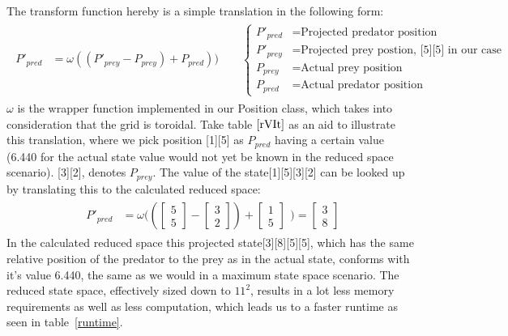 \documentclass[paper=a4, fontsize=11pt]{scrartcl}
\numberwithin{equation}{section}		%
\numberwithin{figure}{section}			%
\numberwithin{table}{section}				%
\begin{document}
\indent The transform function hereby is a simple translation in the following form:
\begin{align}
\begin{split}
P'_{pred} &= \omega((P'_{prey}-P_{prey})+P_{pred}))
\qquad
\begin{cases}
P'_{pred} &= \text{Projected predator position} \\
P'_{prey} &= \text{Projected prey postion, [5][5] in our case} \\
P_{prey} &= \text{Actual prey position} \\
P_{pred} &= \text{Actual predator position}
\end{cases}
\end{split}
\end{align}
$\omega$ is the wrapper function implemented in our Position class, which takes into consideration that the grid is toroidal. 
Take table $\ref{rVIt}$ as an aid to illustrate this translation, where we pick position [1][5] as $P_{pred}$ having a certain value (6.440 for the actual state value would not yet be known in the reduced space scenario). [3][2], denotes $P_{prey}$. The value of the state[1][5][3][2] can be looked up by translating this to the calculated reduced space:
\begin{align}
\begin{split}
P'_{pred}
&=\omega((\begin{bmatrix} 
5 \\
5
\end{bmatrix} -
\begin{bmatrix}
3 \\
2
\end{bmatrix} )+
\begin{bmatrix}
1 \\
5
\end{bmatrix}
\end{split})
=
\begin{bmatrix}
3 \\
8
\end{bmatrix}
\end{align}
In the calculated reduced space this projected state[3][8][5][5], which has the same relative position of the predator to the prey as in the actual state, conforms with it's value 6.440, the same as we would in a maximum state space scenario. The reduced state space, effectively sized down to $11^2$, results in a lot less memory requirements as well as less computation, which leads us to a faster runtime as seen in table~\ref{runtime}. 
\end{document}
